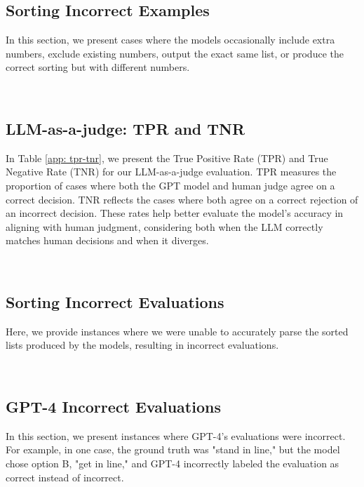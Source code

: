 \subsection{Sorting Incorrect Examples}
\label{app: Sorting incorrect examples}
In this section, we present cases where the models occasionally include extra numbers, exclude existing numbers, output the exact same list, or produce the correct sorting but with different numbers.



\newpage
~\newpage


\subsection{LLM-as-a-judge: TPR and TNR}
\label{app: LLM-as-a-judge: TPR and TNR}
In Table \ref{app: tpr-tnr}, we present the True Positive Rate (TPR) and True Negative Rate (TNR) for our LLM-as-a-judge evaluation. TPR measures the proportion of cases where both the GPT model and human judge agree on a correct decision. TNR reflects the cases where both agree on a correct rejection of an incorrect decision. These rates help better evaluate the model's accuracy in aligning with human judgment, considering both when the LLM correctly matches human decisions and when it diverges.

\newpage
~\newpage

\subsection{Sorting Incorrect Evaluations}
\label{app: Sorting Incorrect Evaluations}
Here, we provide instances where we were unable to accurately parse the sorted lists produced by the models, resulting in incorrect evaluations.



\newpage
~\newpage


\subsection{GPT-4 Incorrect Evaluations}
\label{app: GPT-4 Incorrect Evaluations}
In this section, we present instances where GPT-4's evaluations were incorrect. For example, in one case, the ground truth was "stand in line," but the model chose option B, "get in line," and GPT-4 incorrectly labeled the evaluation as correct instead of incorrect.\medskip

